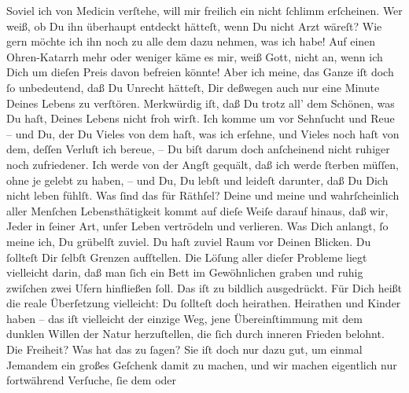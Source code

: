                Soviel ich von Medicin verſtehe, will mir freilich ein \label{K_L02792-12v}\label{K_L02792-12h} nicht ſchlimm erſcheinen. Wer weiß, ob Du ihn
               überhaupt entdeckt hätteſt, {\pb}wenn Du nicht Arzt
               wäreſt? Wie gern möchte ich ihn noch zu alle dem dazu nehmen, was ich habe! Auf einen
               Ohren-Katarrh mehr oder weniger käme es mir, weiß Gott, nicht an, wenn ich Dich \strikeout{\textcolor{gray}{von}} um dieſen Preis davon befreien könnte! Aber ich meine, das Ganze iſt doch ſo
               unbedeutend, daß Du Unrecht hätteſt, Dir deßwegen auch nur eine Minute Deines Lebens
               zu verſtören.\pend
           \pstart
           Merkwürdig iſt, daß Du trotz all’ dem Schönen, was Du haſt, Deines Lebens nicht froh
               wirſt. Ich komme um vor Sehnſucht und Reue – und Du, der Du Vieles von dem haſt, was
               ich erſehne, und Vieles noch haſt von dem, deſſen Verluſt ich bereue, – Du biſt darum
               doch {\pb}anſcheinend nicht ruhiger noch zufriedener.
               Ich werde von der Angſt gequält, daß ich werde ſterben müſſen, ohne je gelebt zu
               haben, – und Du, Du lebſt und leideſt darunter, daß Du Dich nicht leben fühlſt. Was
               ſind das für Räthſel? Deine und meine und \strikeout{\textcolor{gray}{a}} wahrſcheinlich aller Menſchen Lebensthätigkeit kommt auf dieſe Weiſe darauf
               hinaus, daß wir, Jeder in ſeiner Art, unſer Leben vertrödeln und verlieren. Was Dich
               anlangt, ſo meine ich, Du grübelſt zuviel. Du haſt zuviel Raum vor Deinen Blicken.
                  \strikeout{\textcolor{gray}{×}} Du ſollteſt Dir ſelbſt Grenzen aufſtellen. Die Löſung aller dieſer Probleme
                  {\pb}liegt vielleicht darin, daß man ſich ein Bett im
               Gewöhnlichen graben und ruhig zwiſchen zwei Ufern hinfließen ſoll. Das iſt zu
               bildlich ausgedrückt. Für Dich heißt die reale Überſetzung vielleicht: Du ſollteſt
               doch heirathen. Heirathen und Kinder haben – das iſt vielleicht der einzige Weg, jene
               Übereinſtimmung mit dem dunklen Willen der Natur herzuſtellen, die ſich durch inneren
               Frieden belohnt. Die Freiheit? Was hat das zu ſagen? Sie iſt doch nur dazu gut, um
                  {\pb}\strikeout{\textcolor{gray}{e}} einmal Jemandem ein großes Geſchenk damit zu machen, und wir machen  eigentlich nur fortwährend Verſuche, ſie dem oder
